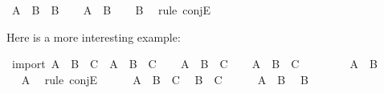 \begin{isabellebody}
\begin{isamarkuptext}
\end{isamarkuptext}\isamarkuptrue%
\isamarkupfalse%
\ {\isachardoublequoteopen}A\ {\isasymand}\ B\ {\isasymlongrightarrow}\ B{\isachardoublequoteclose}\isanewline
%
\isadelimproof
%
\endisadelimproof
%
\isatagproof
{}\isamarkupfalse%
\isanewline
\ \ \isamarkupfalse%
\ {\isachardoublequoteopen}A\ {\isasymand}\ B{\isachardoublequoteclose}\isanewline
\ \ \isamarkupfalse%
\ {\isachardoublequoteopen}B{\isachardoublequoteclose}\ \isamarkupfalse%
\ {\isacharparenleft}rule\ conjE{\isacharparenright}\isanewline
{}\isamarkupfalse%
%
\endisatagproof
{\isafoldproof}%
%
\isadelimproof
%
\endisadelimproof
%
\begin{isamarkuptext}%
Here is a more interesting example:%
\end{isamarkuptext}\isamarkuptrue%
\isamarkupfalse%
\ import{\isacharcolon}\ {\isachardoublequoteopen}{\isacharparenleft}A\ {\isasymlongrightarrow}\ B\ {\isasymlongrightarrow}\ C{\isacharparenright}\ {\isasymlongrightarrow}\ {\isacharparenleft}A\ {\isasymand}\ B\ {\isasymlongrightarrow}\ C{\isacharparenright}{\isachardoublequoteclose}\isanewline
%
\isadelimproof
%
\endisadelimproof
%
\isatagproof
{}\isamarkupfalse%
\isanewline
\ \ \isamarkupfalse%
\ {\isachardoublequoteopen}A\ {\isasymlongrightarrow}\ B\ {\isasymlongrightarrow}\ C{\isachardoublequoteclose}\isanewline
\ \ \isamarkupfalse%
\ {\isachardoublequoteopen}A\ {\isasymand}\ B\ {\isasymlongrightarrow}\ C{\isachardoublequoteclose}\isanewline
\ \ \isamarkupfalse%
\isanewline
\ \ \ \ \isamarkupfalse%
\ {\isachardoublequoteopen}A\ {\isasymand}\ B{\isachardoublequoteclose}\isanewline
\ \ \ \ \isamarkupfalse%
\ \isamarkupfalse%
\ {\isachardoublequoteopen}A{\isachardoublequoteclose}\ \isamarkupfalse%
\ {\isacharparenleft}rule\ conjE{\isacharparenright}\isanewline
\ \ \ \ \isamarkupfalse%
\ {\isacharbackquoteopen}A\ {\isasymlongrightarrow}\ B\ {\isasymlongrightarrow}\ C{\isacharbackquoteclose}\ \isamarkupfalse%
\ {\isachardoublequoteopen}B\ {\isasymlongrightarrow}\ C{\isachardoublequoteclose}\isacommand{{\isachardot}{\isachardot}}\isamarkupfalse%
\isanewline
\ \ \ \ \isamarkupfalse%
\ {\isacharbackquoteopen}A\ {\isasymand}\ B{\isacharbackquoteclose}\ \isamarkupfalse%
\ {\isachardoublequoteopen}B{\isachardoublequoteclose}\ \isamarkupfalse%

\end{isabellebody}
